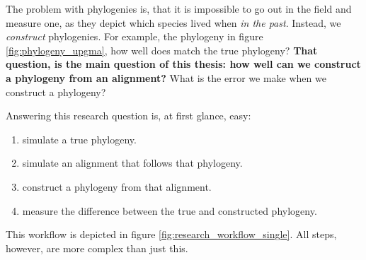 The problem with phylogenies is, 
that it is impossible to go out in the field and measure one, 
as they depict which species lived when \emph{in the past}.
Instead, we \emph{construct} phylogenies. For example,
the phylogeny in figure \ref{fig:phylogeny_upgma}, how well
does match the true phylogeny? \textbf{That question, is the main question of this 
thesis: how well can we construct a
phylogeny from an alignment?} What is the error we
make when we construct a phylogeny?

Answering this research question is, at first glance, easy: 

\begin{enumerate}[label=\arabic*)]\itemsep2pt
  \item simulate a true phylogeny.
  \item simulate an alignment that follows that phylogeny.
  \item construct a phylogeny from that alignment.
  \item measure the difference between the true and constructed phylogeny.
\end{enumerate}

This workflow is depicted in figure \ref{fig:research_workflow_single}.
All steps, however, are more complex than just this.

